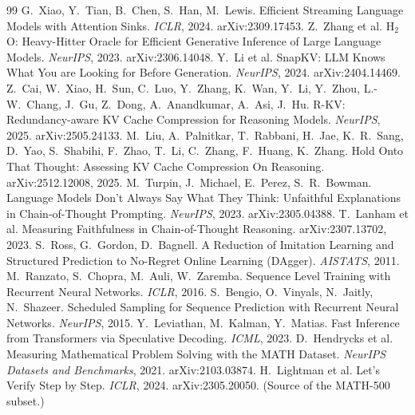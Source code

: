 \documentclass{article}
\begin{document}
\begin{thebibliography}{99}
\small
{} G.~Xiao, Y.~Tian, B.~Chen, S.~Han, M.~Lewis. Efficient Streaming Language Models with Attention Sinks. \emph{ICLR}, 2024. arXiv:2309.17453.
 Z.~Zhang et al. H$_2$O: Heavy-Hitter Oracle for Efficient Generative Inference of Large Language Models. \emph{NeurIPS}, 2023. arXiv:2306.14048.
 Y.~Li et al. SnapKV: LLM Knows What You are Looking for Before Generation. \emph{NeurIPS}, 2024. arXiv:2404.14469.
 Z.~Cai, W.~Xiao, H.~Sun, C.~Luo, Y.~Zhang, K.~Wan, Y.~Li, Y.~Zhou, L.-W.~Chang, J.~Gu, Z.~Dong, A.~Anandkumar, A.~Asi, J.~Hu. R-KV: Redundancy-aware KV Cache Compression for Reasoning Models. \emph{NeurIPS}, 2025. arXiv:2505.24133.
 M.~Liu, A.~Palnitkar, T.~Rabbani, H.~Jae, K.~R.~Sang, D.~Yao, S.~Shabihi, F.~Zhao, T.~Li, C.~Zhang, F.~Huang, K.~Zhang. Hold Onto That Thought: Assessing KV Cache Compression On Reasoning. arXiv:2512.12008, 2025.
 M.~Turpin, J.~Michael, E.~Perez, S.~R.~Bowman. Language Models Don't Always Say What They Think: Unfaithful Explanations in Chain-of-Thought Prompting. \emph{NeurIPS}, 2023. arXiv:2305.04388.
 T.~Lanham et al. Measuring Faithfulness in Chain-of-Thought Reasoning. arXiv:2307.13702, 2023.
 S.~Ross, G.~Gordon, D.~Bagnell. A Reduction of Imitation Learning and Structured Prediction to No-Regret Online Learning (DAgger). \emph{AISTATS}, 2011.
 M.~Ranzato, S.~Chopra, M.~Auli, W.~Zaremba. Sequence Level Training with Recurrent Neural Networks. \emph{ICLR}, 2016.
 S.~Bengio, O.~Vinyals, N.~Jaitly, N.~Shazeer. Scheduled Sampling for Sequence Prediction with Recurrent Neural Networks. \emph{NeurIPS}, 2015.
 Y.~Leviathan, M.~Kalman, Y.~Matias. Fast Inference from Transformers via Speculative Decoding. \emph{ICML}, 2023.
 D.~Hendrycks et al. Measuring Mathematical Problem Solving with the MATH Dataset. \emph{NeurIPS Datasets and Benchmarks}, 2021. arXiv:2103.03874.
 H.~Lightman et al. Let's Verify Step by Step. \emph{ICLR}, 2024. arXiv:2305.20050. (Source of the MATH-500 subset.)

\end{thebibliography}
\end{document}
